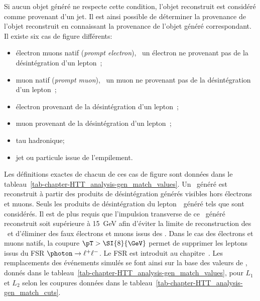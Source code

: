 Si aucun objet généré ne respecte cette condition, l'objet reconstruit est considéré comme provenant d'un jet.
Il est ainsi possible de déterminer la provenance de l'objet reconstruit en connaissant la provenance de l'objet généré correspondant.
Il existe six cas de figure différents:
\begin{itemize}
\item électron muons natif (\emph{prompt electron}), \ie\ un électron ne provenant pas de la désintégration d'un lepton~\tau;
\item muon natif (\emph{prompt muon}), \ie\ un muon ne provenant pas de la désintégration d'un lepton~\tau;
\item électron provenant de la désintégration d'un lepton~\tau;
\item muon provenant de la désintégration d'un lepton~\tau;
\item tau hadronique;
\item jet ou particule issue de l'empilement.
\end{itemize}
Les définitions exactes de chacun de ces cas de figure sont données dans le tableau~\ref{tab-chapter-HTT_analysis-gen_match_values}.
Un \tauh\ généré est reconstruit à partir des produits de désintégration générés visibles hors électrons et muons.
Seuls les produits de désintégration du lepton~\tau\ généré tels que  sont considérés.
Il est de plus requis que l'impulsion transverse de ce \tauh\ généré reconstruit soit supérieure à \SI{15}{\GeV} afin d'éviter la limite de reconstruction des \tauh\ et d'éliminer des faux électrons et muons issus des \tauh.
Dans le cas des électrons et muons natifs, la coupure $\pT > \SI{8}{\GeV}$ permet de supprimer les leptons issus du FSR $\photon\to\ell^+\ell^-$.
Le FSR est introduit au chapitre~.
Les remplacements des événements simulés se font ainsi sur la base des valeurs de , donnés dans le tableau~\ref{tab-chapter-HTT_analysis-gen_match_values}, pour $L_1$ et $L_2$ selon les coupures données dans le tableau~\ref{tab-chapter-HTT_analysis-gen_match_cuts}.
